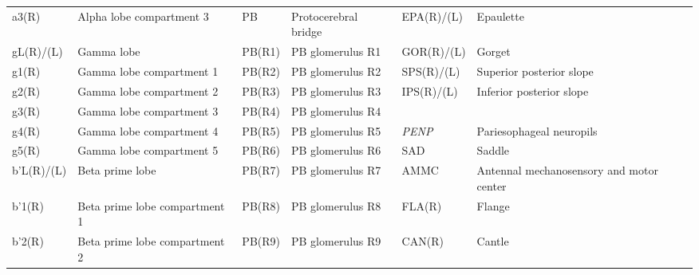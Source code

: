 \documentclass{article}
\begin{document}
\begin{center}
\begin{longtable}{llllll}
\hspace*{1.6em}a3(R) & Alpha lobe compartment 3 & \hspace*{0.8em}PB & Protocerebral bridge & \hspace*{0.8em}EPA(R)/(L) & Epaulette \\
\hspace*{0.8em}gL(R)/(L) & Gamma lobe & \hspace*{1.6em}PB(R1) & PB glomerulus R1 & \hspace*{0.8em}GOR(R)/(L) & Gorget \\
\hspace*{1.6em}g1(R) & Gamma lobe compartment 1 & \hspace*{1.6em}PB(R2) & PB glomerulus R2 & \hspace*{0.8em}SPS(R)/(L) & Superior posterior slope \\
\hspace*{1.6em}g2(R) & Gamma lobe compartment 2 & \hspace*{1.6em}PB(R3) & PB glomerulus R3 & \hspace*{0.8em}IPS(R)/(L) & Inferior posterior slope \\
\hspace*{1.6em}g3(R) & Gamma lobe compartment 3 & \hspace*{1.6em}PB(R4) & PB glomerulus R4 &  &  \\
\hspace*{1.6em}g4(R) & Gamma lobe compartment 4 & \hspace*{1.6em}PB(R5) & PB glomerulus R5 & \emph{PENP} & Pariesophageal neuropils \\
\hspace*{1.6em}g5(R) & Gamma lobe compartment 5 & \hspace*{1.6em}PB(R6) & PB glomerulus R6 & \hspace*{0.8em}SAD & Saddle \\
\hspace*{0.8em}b’L(R)/(L) & Beta prime lobe & \hspace*{1.6em}PB(R7) & PB glomerulus R7 & \hspace*{1.6em}AMMC & Antennal mechanosensory and motor center \\
\hspace*{1.6em}b’1(R) & Beta prime lobe compartment 1 & \hspace*{1.6em}PB(R8) & PB glomerulus R8 & \hspace*{0.8em}FLA(R) & Flange \\
\hspace*{1.6em}b’2(R) & Beta prime lobe compartment 2 & \hspace*{1.6em}PB(R9) & PB glomerulus R9 & \hspace*{0.8em}CAN(R) & Cantle \\

\end{longtable}
\end{center}
\end{document}
